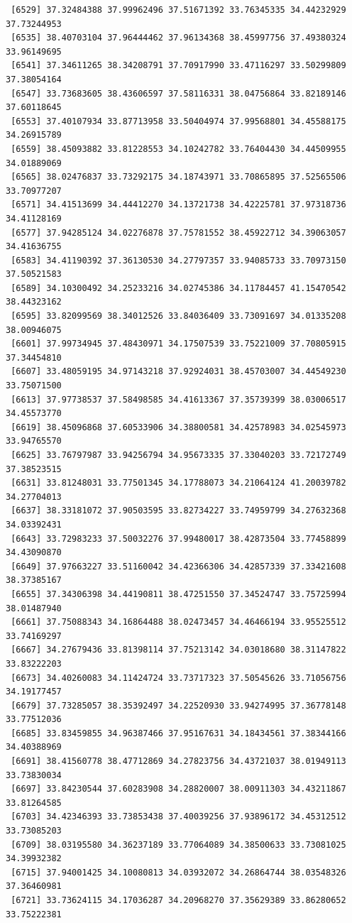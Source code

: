 \documentclass[
  letterpaper,
  DIV=11,
  numbers=noendperiod]{scrartcl}
\begin{document}
\begin{verbatim}
 [6529] 37.32484388 37.99962496 37.51671392 33.76345335 34.44232929 37.73244953
 [6535] 38.40703104 37.96444462 37.96134368 38.45997756 37.49380324 33.96149695
 [6541] 37.34611265 38.34208791 37.70917990 33.47116297 33.50299809 37.38054164
 [6547] 33.73683605 38.43606597 37.58116331 38.04756864 33.82189146 37.60118645
 [6553] 37.40107934 33.87713958 33.50404974 37.99568801 34.45588175 34.26915789
 [6559] 38.45093882 33.81228553 34.10242782 33.76404430 34.44509955 34.01889069
 [6565] 38.02476837 33.73292175 34.18743971 33.70865895 37.52565506 33.70977207
 [6571] 34.41513699 34.44412270 34.13721738 34.42225781 37.97318736 34.41128169
 [6577] 37.94285124 34.02276878 37.75781552 38.45922712 34.39063057 34.41636755
 [6583] 34.41190392 37.36130530 34.27797357 33.94085733 33.70973150 37.50521583
 [6589] 34.10300492 34.25233216 34.02745386 34.11784457 41.15470542 38.44323162
 [6595] 33.82099569 38.34012526 33.84036409 33.73091697 34.01335208 38.00946075
 [6601] 37.99734945 37.48430971 34.17507539 33.75221009 37.70805915 37.34454810
 [6607] 33.48059195 34.97143218 37.92924031 38.45703007 34.44549230 33.75071500
 [6613] 37.97738537 37.58498585 34.41613367 37.35739399 38.03006517 34.45573770
 [6619] 38.45096868 37.60533906 34.38800581 34.42578983 34.02545973 33.94765570
 [6625] 33.76797987 33.94256794 34.95673335 37.33040203 33.72172749 37.38523515
 [6631] 33.81248031 33.77501345 34.17788073 34.21064124 41.20039782 34.27704013
 [6637] 38.33181072 37.90503595 33.82734227 33.74959799 34.27632368 34.03392431
 [6643] 33.72983233 37.50032276 37.99480017 38.42873504 33.77458899 34.43090870
 [6649] 37.97663227 33.51160042 34.42366306 34.42857339 37.33421608 38.37385167
 [6655] 37.34306398 34.44190811 38.47251550 37.34524747 33.75725994 38.01487940
 [6661] 37.75088343 34.16864488 38.02473457 34.46466194 33.95525512 33.74169297
 [6667] 34.27679436 33.81398114 37.75213142 34.03018680 38.31147822 33.83222203
 [6673] 34.40260083 34.11424724 33.73717323 37.50545626 33.71056756 34.19177457
 [6679] 37.73285057 38.35392497 34.22520930 33.94274995 37.36778148 33.77512036
 [6685] 33.83459855 34.96387466 37.95167631 34.18434561 37.38344166 34.40388969
 [6691] 38.41560778 38.47712869 34.27823756 34.43721037 38.01949113 33.73830034
 [6697] 33.84230544 37.60283908 34.28820007 38.00911303 34.43211867 33.81264585
 [6703] 34.42346393 33.73853438 37.40039256 37.93896172 34.45312512 33.73085203
 [6709] 38.03195580 34.36237189 33.77064089 34.38500633 33.73081025 34.39932382
 [6715] 37.94001425 34.10080813 34.03932072 34.26864744 38.03548326 37.36460981
 [6721] 33.73624115 34.17036287 34.20968270 37.35629389 33.86280652 33.75222381

\end{verbatim}
\end{document}
